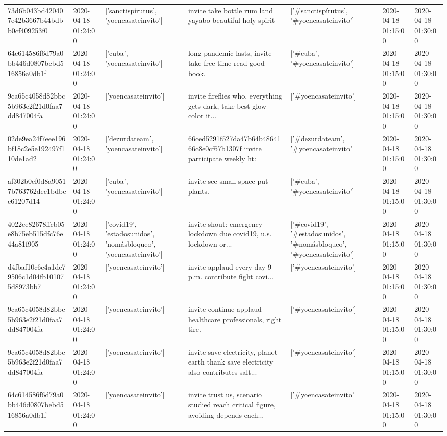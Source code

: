 \begin{tabular}{lllllll}
73d6b043bd420407e42b3667b44bdbb0cf409253f0 & 2020-04-18 01:24:00 & ['sanctispírutus', 'yoencasateinvito'] & invite take bottle rum land yayabo beautiful holy spirit & ['#sanctispírutus', '#yoencasateinvito'] & 2020-04-18 01:15:00 & 2020-04-18 01:30:00 \\
64c614586f6d79a0bb446d0807bebd516856a0db1f & 2020-04-18 01:24:00 & ['cuba', 'yoencasateinvito'] & long pandemic lasts, invite take free time read good book. & ['#cuba', '#yoencasateinvito'] & 2020-04-18 01:15:00 & 2020-04-18 01:30:00 \\
9ca65c4058d82bbc5b963e2f21d0faa7dd847004fa & 2020-04-18 01:24:00 & ['yoencasateinvito'] & invite fireflies who, everything gets dark, take best glow color it... & ['#yoencasateinvito'] & 2020-04-18 01:15:00 & 2020-04-18 01:30:00 \\
02de9ea24f7eee196bf18c2e5e192497f110de1ad2 & 2020-04-18 01:24:00 & ['dezurdateam', 'yoencasateinvito'] & 66ced5291f527da47b64b4864166c8e0cf67b1307f invite participate weekly ht: & ['#dezurdateam', '#yoencasateinvito'] & 2020-04-18 01:15:00 & 2020-04-18 01:30:00 \\
af302b0ef0d8a90517b763762dec1bdbcc61207d14 & 2020-04-18 01:24:00 & ['cuba', 'yoencasateinvito'] & invite see small space put plants. & ['#cuba', '#yoencasateinvito'] & 2020-04-18 01:15:00 & 2020-04-18 01:30:00 \\
4022ee82678ffcb05e8b75eb515dfc76e44a81f905 & 2020-04-18 01:24:00 & ['covid19', 'estadosunidos', 'nomásbloqueo', 'yoencasateinvito'] & invite shout: emergency lockdown due covid19, u.s. lockdown or... & ['#covid19', '#estadosunidos', '#nomásbloqueo', '#yoencasateinvito'] & 2020-04-18 01:15:00 & 2020-04-18 01:30:00 \\
d4fbaf10c6c4a1de79506c1d04fb101075d8973bb7 & 2020-04-18 01:24:00 & ['yoencasateinvito'] & invite applaud every day 9 p.m. contribute fight covi... & ['#yoencasateinvito'] & 2020-04-18 01:15:00 & 2020-04-18 01:30:00 \\
9ca65c4058d82bbc5b963e2f21d0faa7dd847004fa & 2020-04-18 01:24:00 & ['yoencasateinvito'] & invite continue applaud healthcare professionals, right tire. & ['#yoencasateinvito'] & 2020-04-18 01:15:00 & 2020-04-18 01:30:00 \\
9ca65c4058d82bbc5b963e2f21d0faa7dd847004fa & 2020-04-18 01:24:00 & ['yoencasateinvito'] & invite save electricity, planet earth thank save electricity also contributes salt... & ['#yoencasateinvito'] & 2020-04-18 01:15:00 & 2020-04-18 01:30:00 \\
64c614586f6d79a0bb446d0807bebd516856a0db1f & 2020-04-18 01:24:00 & ['yoencasateinvito'] & invite trust us, scenario studied reach critical figure, avoiding depends each... & ['#yoencasateinvito'] & 2020-04-18 01:15:00 & 2020-04-18 01:30:00 \\

\end{tabular}

